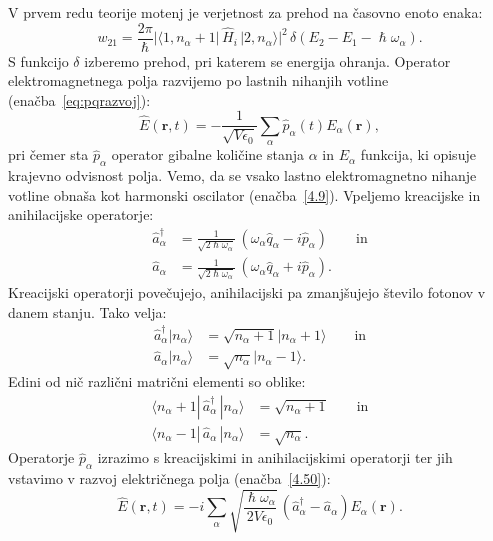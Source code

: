 V prvem redu teorije motenj je verjetnost za prehod na časovno enoto enaka:
\begin{equation}
w_{21}=\frac{2\pi}{\hslash}|\langle1,n_{\alpha}+
1|\,\hat{H}_{i}\,|2,n_{\alpha}\rangle|^{2}\,
\delta(E_{2}-E_{1}-\hslash\omega_{\alpha}).
\label{4.49}
\end{equation}
S funkcijo $\delta$ izberemo prehod, pri katerem se energija ohranja.
Operator elektromagnetnega polja razvijemo po lastnih nihanjih votline (enačba~\ref{eq:pqrazvoj}):
\begin{equation}
\hat{E}(\mathbf{r},t)=-\frac{1}{\sqrt{V\epsilon_{0}}}\sum_{\alpha}
\hat{p}_{\alpha}(t)E_{\alpha}(\mathbf{r}),
\label{4.50}
\end{equation}
pri čemer sta $\hat{p}_{\alpha}$ operator gibalne količine stanja $\alpha$ in $E_{\alpha}$
funkcija, ki opisuje krajevno odvisnost polja. Vemo, da se vsako lastno
elektromagnetno nihanje votline obnaša kot harmonski oscilator (enačba~\ref{4.9}).
Vpeljemo kreacijske in anihilacijske operatorje:
\begin{align}
\hat{a}_{\alpha}^{\dagger} & =  \frac{1}{\sqrt{2\hslash\omega_{\alpha}}}\,
(\omega_{\alpha}\hat{q}_{\alpha}-i\hat{p}_{\alpha}) \qquad \mathrm{in} \\
\hat{a}_{\alpha} & =  \frac{1}{\sqrt{2\hslash\omega_{\alpha}}}\,(\omega_{\alpha}\hat{q}_{\alpha}+i\hat{p}_{\alpha}).
\end{align}
Kreacijski operatorji povečujejo, anihilacijski pa zmanjšujejo število
fotonov v danem stanju. Tako velja:
\begin{align}
\hat{a}_{\alpha}^{\dagger}|n_{\alpha}\rangle & =  \sqrt{n_{\alpha}+1}
|n_{\alpha}+1\rangle\qquad \mathrm{in} \\
\hat{a}_{\alpha}|n_{\alpha}\rangle & =  \sqrt{n_{\alpha}}|n_{\alpha}-1\rangle.
\end{align}
Edini od nič različni matrični elementi so oblike:
\begin{align}
\langle n_\alpha +1|\, \hat{a}_{\alpha}^{\dagger}\,|n_{\alpha}\rangle & = 
\sqrt{n_{\alpha}+1} \qquad \mathrm{in} \label{eq:ankr.1}\\
\langle n_\alpha-1|\,\hat{a}_{\alpha}\,|n_{\alpha}\rangle & =  \sqrt{n_{\alpha}}.
\label{eq:ankr}
\end{align}
Operatorje $\hat{p}_{\alpha}$ izrazimo s kreacijskimi in anihilacijskimi
operatorji ter jih vstavimo v razvoj električnega polja (enačba~\ref{4.50}):
\begin{equation}
\hat{E}(\mathbf{r},t)=-i\sum_{\alpha}\sqrt{\frac{\hslash\omega_{\alpha}}{2V\epsilon_{0}}}\,
\left(\hat{a}_{\alpha}^{\dagger}-\hat{a}_{\alpha}\right)E_{\alpha}(\mathbf{r}).
\label{4.53}
\end{equation}
